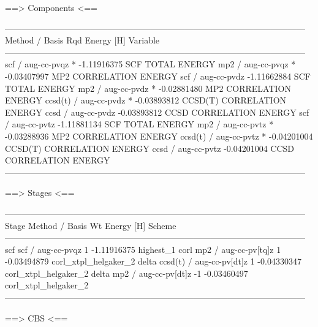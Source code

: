 \begin{Snippet}
   ==> Components <==

  ---------------------------------------------------------------------------------------------------------
                          Method / Basis                      Rqd       Energy [H]   Variable
  ---------------------------------------------------------------------------------------------------------
                             scf / aug-cc-pvqz                  *      -1.11916375   SCF TOTAL ENERGY
                             mp2 / aug-cc-pvqz                  *      -0.03407997   MP2 CORRELATION ENERGY
                             scf / aug-cc-pvdz                         -1.11662884   SCF TOTAL ENERGY
                             mp2 / aug-cc-pvdz                  *      -0.02881480   MP2 CORRELATION ENERGY
                         ccsd(t) / aug-cc-pvdz                  *      -0.03893812   CCSD(T) CORRELATION ENERGY
                            ccsd / aug-cc-pvdz                         -0.03893812   CCSD CORRELATION ENERGY
                             scf / aug-cc-pvtz                         -1.11881134   SCF TOTAL ENERGY
                             mp2 / aug-cc-pvtz                  *      -0.03288936   MP2 CORRELATION ENERGY
                         ccsd(t) / aug-cc-pvtz                  *      -0.04201004   CCSD(T) CORRELATION ENERGY
                            ccsd / aug-cc-pvtz                         -0.04201004   CCSD CORRELATION ENERGY
  ---------------------------------------------------------------------------------------------------------

   ==> Stages <==

  ---------------------------------------------------------------------------------------------------------
      Stage               Method / Basis                       Wt       Energy [H]   Scheme
  ---------------------------------------------------------------------------------------------------------
        scf                  scf / aug-cc-pvqz                  1      -1.11916375   highest_1
       corl                  mp2 / aug-cc-pv[tq]z               1      -0.03494879   corl_xtpl_helgaker_2
      delta              ccsd(t) / aug-cc-pv[dt]z               1      -0.04330347   corl_xtpl_helgaker_2
      delta                  mp2 / aug-cc-pv[dt]z              -1      -0.03460497   corl_xtpl_helgaker_2
  ---------------------------------------------------------------------------------------------------------

   ==> CBS <==


\end{Snippet}
